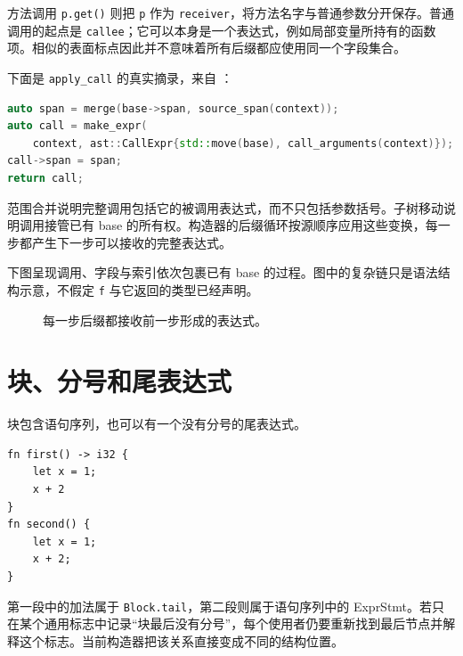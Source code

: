 方法调用 \texttt{p.get()} 则把 \texttt{p} 作为 \texttt{receiver}，将方法名字与普通参数分开保存。普通调用的起点是 \texttt{callee}；它可以本身是一个表达式，例如局部变量所持有的函数项。相似的表面标点因此并不意味着所有后缀都应使用同一个字段集合。

下面是 \texttt{apply\_call} 的真实摘录，来自 ：
\begin{lstlisting}[language=C++]
auto span = merge(base->span, source_span(context));
auto call = make_expr(
    context, ast::CallExpr{std::move(base), call_arguments(context)});
call->span = span;
return call;
\end{lstlisting}
范围合并说明完整调用包括它的被调用表达式，而不只包括参数括号。子树移动说明调用接管已有 base 的所有权。构造器的后缀循环按源顺序应用这些变换，每一步都产生下一步可以接收的完整表达式。

下图呈现调用、字段与索引依次包裹已有 base 的过程。图中的复杂链只是语法结构示意，不假定 \texttt{f} 与它返回的类型已经声明。
\begin{figure}[htbp]
\centering
{}
\caption{每一步后缀都接收前一步形成的表达式。}
\end{figure}

\section{块、分号和尾表达式}
块包含语句序列，也可以有一个没有分号的尾表达式。
\begin{lstlisting}[language=Rustless]
fn first() -> i32 {
    let x = 1;
    x + 2
}
fn second() {
    let x = 1;
    x + 2;
}
\end{lstlisting}
第一段中的加法属于 \texttt{Block.tail}，第二段则属于语句序列中的 ExprStmt。若只在某个通用标志中记录“块最后没有分号”，每个使用者仍要重新找到最后节点并解释这个标志。当前构造器把该关系直接变成不同的结构位置。

